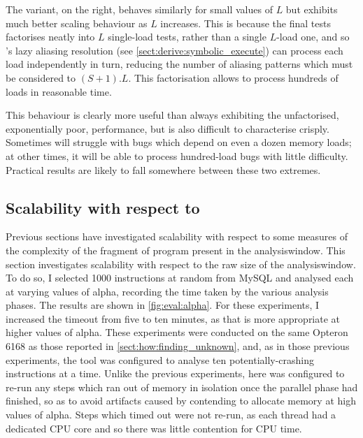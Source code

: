The  variant, on the right, behaves similarly for small
values of $L$ but exhibits much better scaling behaviour as $L$
increases.  This is because the final tests factorises neatly into $L$
single-load tests, rather than a single $L$-load one, and so
{\technique}'s lazy aliasing resolution (see
\autoref{sect:derive:symbolic_execute}) can process each load
independently in turn, reducing the number of aliasing patterns which
must be considered to $(S+1).L$.  This factorisation allows
{\technique} to process hundreds of loads in reasonable time.

This behaviour is clearly more useful than always exhibiting the
unfactorised, exponentially poor, performance, but is also difficult
to characterise crisply.  Sometimes {\technique} will struggle
with bugs which depend on even a dozen memory loads; at other times,
it will be able to process hundred-load bugs with little difficulty.
Practical results are likely to fall somewhere between these two
extremes.

\newpage
\subsection{Scalability with respect to }



\noindent
Previous sections have investigated scalability with respect to some
measures of the complexity of the fragment of program present in the
\gls{analysiswindow}.  This section investigates scalability with
respect to the raw size of the \gls{analysiswindow}.  To do so, I
selected 1000 instructions at random from MySQL and analysed each at
varying values of \gls{alpha}, recording the time taken by the various
analysis phases.  The results are shown in \autoref{fig:eval:alpha}.
For these experiments, I increased the timeout from five to ten
minutes, as that is more appropriate at higher values of \gls{alpha}.
These experiments were conducted on the same Opteron 6168 as those
reported in \autoref{sect:how:finding_unknown}, and, as in those
previous experiments, the {\technique} tool was configured to analyse
ten potentially-crashing instructions at a time.  Unlike the previous
experiments, here {\technique} was configured to re-run any steps
which ran out of memory in isolation once the parallel phase had
finished, so as to avoid artifacts caused by contending to allocate
memory at high values of \gls{alpha}.  Steps which timed out were not
re-run, as each thread had a dedicated CPU core and so there was
little contention for CPU time.

